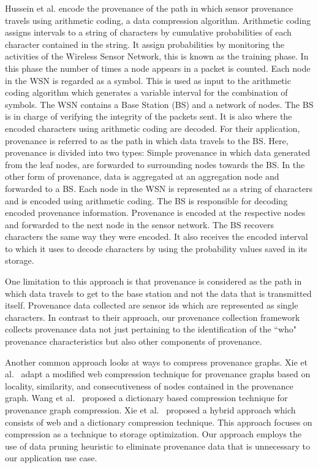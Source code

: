 Hussein et al. \cite{hussain_secure_2014} encode the provenance of the path in which  sensor provenance travels using arithmetic coding, a data compression algorithm. Arithmetic coding assigns intervals to a string of characters by  cumulative probabilities of each character contained in the string. It assign probabilities by monitoring the activities of the Wireless Sensor Network, this is known as the training phase. In this phase the number of times a node appears in a packet is counted. Each node in the WSN is regarded as a symbol. This is used as input to the arithmetic coding algorithm which generates a variable interval for the combination of symbols. The WSN contains a Base Station (BS) and a network of nodes. The BS is in charge of verifying the integrity of the packets sent. It is also where the encoded characters using arithmetic coding are decoded. For their application, provenance is referred to as the path in which data travels to the BS. Here, provenance is divided into two types: Simple provenance in which data generated from the leaf nodes, are forwarded to surrounding nodes towards the BS. In the other form of provenance, data is aggregated at an aggregation node and forwarded to a BS. Each node in the WSN is represented as a string of characters and is encoded using arithmetic coding. The BS is responsible for decoding encoded provenance information. Provenance is encoded at the respective nodes and forwarded to the next node in the sensor network. The BS recovers characters the same way they were encoded. It also receives the encoded interval to which it uses to decode characters by using the probability values saved in its storage.

 One limitation to this approach is that provenance is considered as the path in which data travels to get to the base station and not the data that is transmitted itself. Provenance data collected are sensor ids which are represented as single characters. In contrast to their approach, our provenance collection framework collects provenance data not just pertaining to the identification of the ``who" provenance characteristics but also other components of provenance. 
 
 Another common approach looks at ways to compress provenance graphs. Xie et al.~\cite{xie11-tapp}  adapt a modified web compression technique for provenance graphs based on locality, similarity, and consecutiveness of nodes contained in the provenance graph.  Wang et al.~\cite{7038199} proposed a dictionary based compression technique for provenance graph compression.  Xie et al.~\cite{Xie:2012:HAE:2396761.2398511} proposed a hybrid approach which consists of web and a dictionary compression technique. This approach focuses on compression as a technique to storage optimization. Our approach employs the use of data pruning heuristic  to eliminate provenance data that is unnecessary to our application use case. 
 

